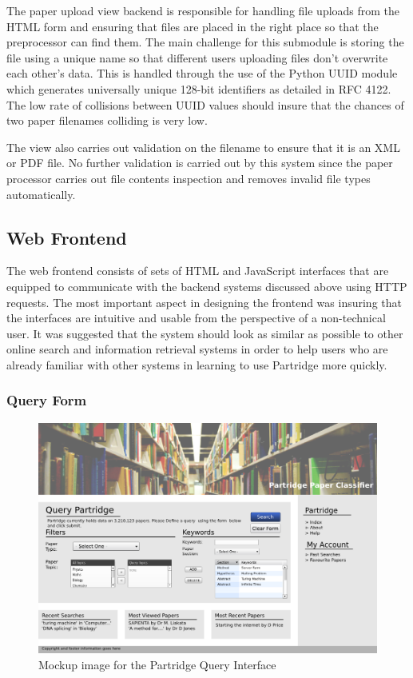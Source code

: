 The paper upload view backend is responsible for handling file uploads from the
HTML form and ensuring that files are placed in the right place so that the
preprocessor can find them. The main challenge for this submodule is storing
the file using a unique name so that different users uploading files don't
overwrite each other's data. This is handled through the use of the Python UUID
module which generates universally unique 128-bit identifiers as detailed in RFC
4122\cite{rfc4122}. The low rate of collisions between UUID values should
insure that the chances of two paper filenames colliding is very low. 

The view also carries out validation on the filename to ensure that it is an
XML or PDF file. No further validation is carried out by this system since the
paper processor carries out file contents inspection and removes invalid file
types automatically.


\subsection{ Web Frontend }
\label{sec:web_frontend}

The web frontend consists of sets of HTML and JavaScript interfaces that are
equipped to communicate with the backend systems discussed above using HTTP
requests. The most important aspect in designing the frontend was insuring that
the interfaces are intuitive and usable from the perspective of a non-technical
user. It was suggested that the system should look as similar as possible to
other online search and information retrieval systems in order to help users
who are already familiar with other systems in learning to use Partridge more
quickly.

\subsubsection{ Query Form }

\begin{figure}[!htb]
\vspace{5mm}
\centering
\includegraphics[width=\textwidth]{images/design/query_mockup.png}
\caption{Mockup image for the Partridge Query Interface}
\label{fig:query_mockup}
\end{figure}

